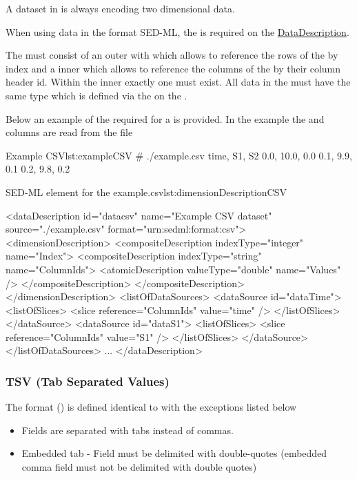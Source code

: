 A dataset in  is always encoding two dimensional data. 

When using data in the  format  SED-ML, the \hyperref[sec:dimensionDescription]{} is required on the \hyperref[class:dataDescription]{DataDescription}. 

The {} must consist of an outer  with  which allows to reference the rows of the  by index and a inner  which allows to reference the columns of the  by their column header id. Within the inner  exactly one  must exist. All data in the  must have the same type  which is defined via the  on the .

Below an example of the required \hyperref[sec:dimensionDescription]{} for a  is provided. In the example the  and  columns are read from the  file
\begin{myXmlLst}{Example CSV}{lst:exampleCSV}
# ./example.csv
time, S1, S2
0.0, 10.0, 0.0
0.1, 9.9, 0.1
0.2, 9.8, 0.2
\end{myXmlLst}

\begin{myXmlLst}{SED-ML  element for the example.csv}{lst:dimensionDescriptionCSV}

<dataDescription id="datacsv" name="Example CSV dataset" source="./example.csv" format="urn:sedml:format:csv">
  <dimensionDescription>
    <compositeDescription indexType="integer" name="Index">
      <compositeDescription indexType="string" name="ColumnIds">
        <atomicDescription valueType="double" name="Values" />
      </compositeDescription>
    </compositeDescription>
  </dimensionDescription>
  <listOfDataSources>
    <dataSource id="dataTime">
      <listOfSlices>
        <slice reference="ColumnIds" value="time" />
      </listOfSlices>
    </dataSource>
    <dataSource id="dataS1">
      <listOfSlices>
        <slice reference="ColumnIds" value="S1" />
      </listOfSlices>
    </dataSource>
  </listOfDataSources>
  ...          
</dataDescription>
\end{myXmlLst} 

\subsubsection{TSV (Tab Separated Values)}
\label{sec:dataFormatTSV}
The format  () is defined identical to \hyperref[sec:dataFormatCSV]{} with the exceptions listed below
\begin{itemize}
    \item Fields are separated with tabs instead of commas.
    \item Embedded tab - Field must be delimited with double-quotes (embedded comma field must not be delimited with double quotes)
\end{itemize}


